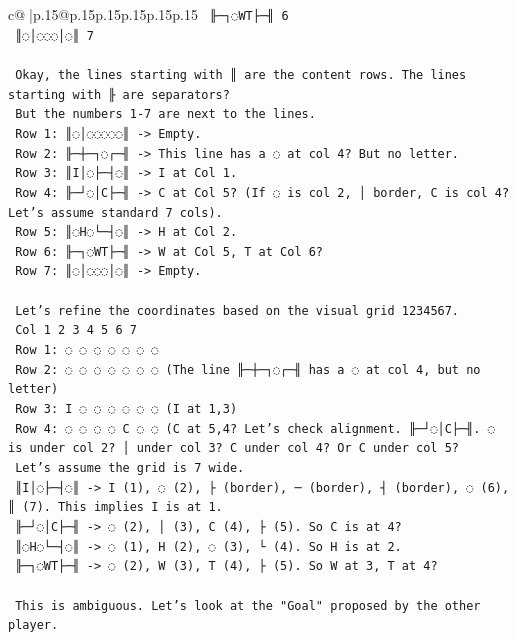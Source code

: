 \documentclass{article}
\begin{document}
{\begin{supertabular}{c@{$\;$}|p{.15\linewidth}@{}p{.15\linewidth}p{.15\linewidth}p{.15\linewidth}p{.15\linewidth}p{.15\linewidth}}
{{{\texttt{   ╟─┐◌WT├─╢ 6} \\
\texttt{   ║◌│◌◌◌│◌║ 7} \\
\\ 
\texttt{   Okay, the lines starting with ║ are the content rows. The lines starting with ╟ are separators?} \\
\texttt{   But the numbers 1{-}7 are next to the lines.} \\
\texttt{   Row 1: ║◌│◌◌◌◌◌║ {-}> Empty.} \\
\texttt{   Row 2: ╟─┼─┐◌┌─╢ {-}> This line has a ◌ at col 4? But no letter.} \\
\texttt{   Row 3: ║I│◌├─┤◌║ {-}> I at Col 1.} \\
\texttt{   Row 4: ╟─┘◌│C├─╢ {-}> C at Col 5? (If ◌ is col 2, │ border, C is col 4? Let's assume standard 7 cols).} \\
\texttt{   Row 5: ║◌H◌└─┤◌║ {-}> H at Col 2.} \\
\texttt{   Row 6: ╟─┐◌WT├─╢ {-}> W at Col 5, T at Col 6?} \\
\texttt{   Row 7: ║◌│◌◌◌│◌║ {-}> Empty.} \\
\\ 
\texttt{   Let's refine the coordinates based on the visual grid 1234567.} \\
\texttt{   Col 1 2 3 4 5 6 7} \\
\texttt{   Row 1: ◌ ◌ ◌ ◌ ◌ ◌ ◌} \\
\texttt{   Row 2: ◌ ◌ ◌ ◌ ◌ ◌ ◌ (The line ╟─┼─┐◌┌─╢ has a ◌ at col 4, but no letter)} \\
\texttt{   Row 3: I ◌ ◌ ◌ ◌ ◌ ◌ (I at 1,3)} \\
\texttt{   Row 4: ◌ ◌ ◌ ◌ C ◌ ◌ (C at 5,4? Let's check alignment. ╟─┘◌│C├─╢. ◌ is under col 2? │ under col 3? C under col 4? Or C under col 5?} \\
\texttt{   Let's assume the grid is 7 wide.} \\
\texttt{   ║I│◌├─┤◌║ {-}> I (1), ◌ (2), ├ (border), ─ (border), ┤ (border), ◌ (6), ║ (7). This implies I is at 1.} \\
\texttt{   ╟─┘◌│C├─╢ {-}> ◌ (2), │ (3), C (4), ├ (5). So C is at 4?} \\
\texttt{   ║◌H◌└─┤◌║ {-}> ◌ (1), H (2), ◌ (3), └ (4). So H is at 2.} \\
\texttt{   ╟─┐◌WT├─╢ {-}> ◌ (2), W (3), T (4), ├ (5). So W at 3, T at 4?} \\
\\ 
\texttt{   This is ambiguous. Let's look at the "Goal" proposed by the other player.} \\
}}}
\end{supertabular}}
\end{document}
